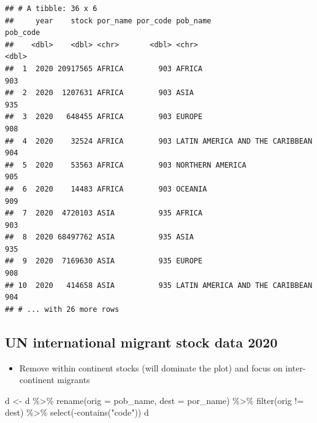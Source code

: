 \documentclass[
]{book}
\newenvironment{Shaded}{\begin{snugshade}}{\end{snugshade}}
\newcommand{\AttributeTok}[1]{\textcolor[rgb]{0.77,0.63,0.00}{#1}}
\newcommand{\FunctionTok}[1]{\textcolor[rgb]{0.00,0.00,0.00}{#1}}
\newcommand{\NormalTok}[1]{#1}
\newcommand{\OtherTok}[1]{\textcolor[rgb]{0.56,0.35,0.01}{#1}}
\newcommand{\SpecialCharTok}[1]{\textcolor[rgb]{0.00,0.00,0.00}{#1}}
\newcommand{\StringTok}[1]{\textcolor[rgb]{0.31,0.60,0.02}{#1}}
\providecommand{\tightlist}{%
  \setlength{\itemsep}{0pt}\setlength{\parskip}{0pt}}
\begin{document}
\begin{verbatim}
## # A tibble: 36 x 6
##     year    stock por_name por_code pob_name                        pob_code
##    <dbl>    <dbl> <chr>       <dbl> <chr>                              <dbl>
##  1  2020 20917565 AFRICA        903 AFRICA                               903
##  2  2020  1207631 AFRICA        903 ASIA                                 935
##  3  2020   648455 AFRICA        903 EUROPE                               908
##  4  2020    32524 AFRICA        903 LATIN AMERICA AND THE CARIBBEAN      904
##  5  2020    53563 AFRICA        903 NORTHERN AMERICA                     905
##  6  2020    14483 AFRICA        903 OCEANIA                              909
##  7  2020  4720103 ASIA          935 AFRICA                               903
##  8  2020 68497762 ASIA          935 ASIA                                 935
##  9  2020  7169630 ASIA          935 EUROPE                               908
## 10  2020   414658 ASIA          935 LATIN AMERICA AND THE CARIBBEAN      904
## # ... with 26 more rows
\end{verbatim}

\hypertarget{un-international-migrant-stock-data-2020-2}{%
\subsection{UN international migrant stock data 2020}\label{un-international-migrant-stock-data-2020-2}}

\begin{itemize}
\tightlist
\item
  Remove within continent stocks (will dominate the plot) and focus on inter-continent migrants
\end{itemize}

\begin{Shaded}
\begin{Highlighting}[]
\NormalTok{d }\OtherTok{\textless{}{-}}\NormalTok{ d }\SpecialCharTok{\%\textgreater{}\%}
  \FunctionTok{rename}\NormalTok{(}\AttributeTok{orig =}\NormalTok{ pob\_name,}
         \AttributeTok{dest =}\NormalTok{ por\_name) }\SpecialCharTok{\%\textgreater{}\%}
  \FunctionTok{filter}\NormalTok{(orig }\SpecialCharTok{!=}\NormalTok{ dest) }\SpecialCharTok{\%\textgreater{}\%}
  \FunctionTok{select}\NormalTok{(}\SpecialCharTok{{-}}\FunctionTok{contains}\NormalTok{(}\StringTok{"code"}\NormalTok{))}
\NormalTok{d}
\end{Highlighting}
\end{Shaded}
\end{document}
